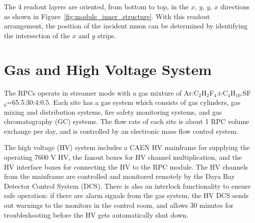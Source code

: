 The 4 readout layers are oriented, from bottom to top, in the $x$, $y$, $y$, $x$ directions as shown in Figure~\ref{fig:module_inner_structure}. With this readout arrangement, the position of the incident muon can be determined by identifying the intersection of the $x$ and $y$ strips.


\section{Gas and High Voltage System}
The RPCs operate in streamer mode with a gas mixture of Ar:C$_2$H$_2$F$_4$:i-C$_4$H$_{10}$:SF$_6$=65.5:30:4:0.5. Each site has a gas system which consists of gas cylinders, gas mixing and distribution systems, fire safety monitoring systems, and gas chromatography (GC) systems. The flow rate of each site is about 1 RPC volume exchange per day, and is controlled by an electronic mass flow control system.

The high voltage (HV) system includes a CAEN HV mainframe for supplying the operating 7600 V HV, the fanout boxes for HV channel multiplication, and the HV interface boxes for connecting the HV to the RPC module. The HV channels from the mainframe are controlled and monitored remotely by the Daya Bay Detector Control System (DCS). There is also an interlock functionality to ensure safe operation: if there are alarm signals from the gas system, the HV DCS sends out warnings to the monitors in the control room, and allows 30 minutes for troubleshooting before the HV gets automatically shut down.


